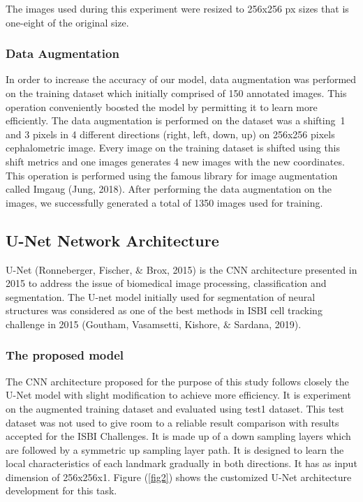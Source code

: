 \documentclass{elektr}
\begin{document}
The images used during this experiment were resized to 256x256 px sizes that is one-eight of the original size. 

\subsubsection{Data Augmentation}
\label{DataAugmentation}
\tab In order to increase the accuracy of our model, data augmentation was performed on the training dataset which initially comprised of 150 annotated images. This operation conveniently boosted the model by permitting it to learn more efficiently. The data augmentation is performed on the dataset was a shifting\  1 and 3 pixels in 4 different directions (right, left, down, up) on 256x256 pixels cephalometric image. Every image on the training dataset is shifted using this shift metrics and one images generates 4 new images with the new coordinates. This operation is performed using the famous library for image augmentation called Imgaug (Jung, 2018). After performing the data augmentation on the images, we successfully generated a total of 1350 images used for training. 

\subsection{U-Net Network Architecture}
\tab U-Net (Ronneberger, Fischer, $\&$  Brox, 2015) is the CNN architecture presented in 2015 to address the issue of biomedical image processing, classification and segmentation. The U-net model initially used for segmentation of neural structures was considered as one of the best methods in ISBI cell tracking challenge in 2015 (Goutham, Vasamsetti, Kishore, $\&$  Sardana, 2019). 


\begin{adjustwidth}{0.40in}{0.24in}
	\subsubsection*{The proposed model }
\end{adjustwidth}


The CNN architecture proposed for the purpose of this study follows closely the U-Net model with slight modification to achieve more efficiency. It is experiment on the augmented training dataset and evaluated using test1 dataset. This test dataset was not used to give room to a reliable result comparison with results accepted for the ISBI Challenges. It is made up of a down sampling layers which are followed by a symmetric up sampling layer path. It is designed to learn the local characteristics of each landmark gradually in both directions. It has as input dimension of 256x256x1. Figure (\ref{fig2}) shows the customized U-Net architecture development for this task.
\end{document}
